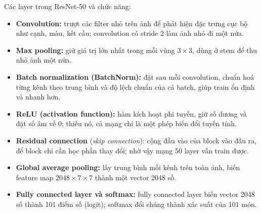 \documentclass[a4paper,12pt]{article}
\begin{document}
Các layer trong ResNet-50 và chức năng:
\begin{itemize}
    \item \textbf{Convolution:} trượt các filter nhỏ trên ảnh để phát hiện đặc trưng cục bộ như cạnh, màu, kết cấu; convolution có stride 2 làm ảnh nhỏ đi một nửa.
    \item \textbf{Max pooling:} giữ giá trị lớn nhất trong mỗi vùng \(3\times3\), dùng ở stem để thu nhỏ ảnh một nửa.
    \item \textbf{Batch normalization (BatchNorm):} đặt sau mỗi convolution, chuẩn hoá từng kênh theo trung bình và độ lệch chuẩn của cả batch, giúp train ổn định và nhanh hơn.
    \item \textbf{ReLU (activation function):} hàm kích hoạt phi tuyến, giữ số dương và đặt số âm về 0; thiếu nó, cả mạng chỉ là một phép biến đổi tuyến tính.
    \item \textbf{Residual connection} (\emph{skip connection}): cộng đầu vào của block vào đầu ra, để block chỉ cần học phần thay đổi; nhờ vậy mạng 50 layer vẫn train được.
    \item \textbf{Global average pooling:} lấy trung bình mỗi kênh trên toàn ảnh, biến feature map \(2048\times7\times7\) thành một vector 2048 số.
    \item \textbf{Fully connected layer và softmax:} fully connected layer biến vector 2048 số thành 101 điểm số (logit); softmax đổi chúng thành xác suất của 101 món.
\end{itemize}
\end{document}
